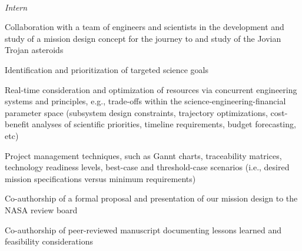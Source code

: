 \\  
\vspace{-0.8em}
\textit{Intern}
\begin{itemize*}
  \item Collaboration with a team of engineers and scientists in the
    development and study of a mission design concept for the journey to
    and study of the Jovian Trojan asteroids 
  \item Identification and prioritization of targeted science goals
  \item Real-time consideration and optimization of resources via
    concurrent engineering systems and principles, e.g., trade-offs
    within the science-engineering-financial parameter space (subsystem
    design constraints, trajectory optimizations, cost-benefit analyses of
    scientific priorities, timeline requirements, budget forecasting,
    etc)
  \item Project management techniques, such as Gannt charts,
    traceability matrices, technology readiness levels,
    best-case and threshold-case scenarios (i.e., desired mission
    specifications versus minimum requirements)
  \item Co-authorship of a formal proposal and presentation of our mission
    design to the NASA review board
  \item Co-authorship of peer-reviewed manuscript documenting lessons
    learned and feasibility considerations
\end{itemize*}

